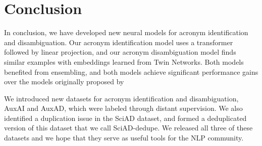 \documentclass[letterpaper]{article} %
\begin{document}
\section{Conclusion}
In conclusion, we have developed new neural models for acronym identification and disambiguation. Our acronym identification model uses a transformer followed by linear projection, and our acronym disambiguation model finds similar examples with embeddings learned from Twin Networks. Both models benefited from ensembling, and both models achieve significant performance gains over the models originally proposed by \citeauthor{veyseh-et-al-2020-what} 

We introduced new datasets for acronym identification and disambiguation, AuxAI and AuxAD, which were labeled through distant supervision. We also identified a duplication issue in the SciAD dataset, and formed a deduplicated version of this dataset that we call SciAD-dedupe. We released all three of these datasets and we hope that they serve as useful tools for the NLP community.



\end{document}
